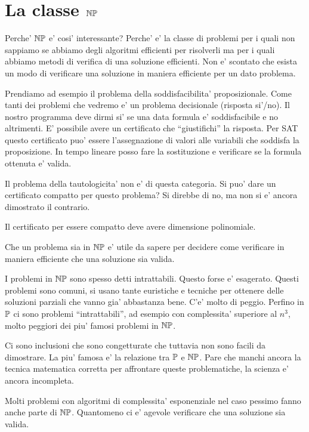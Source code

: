 \section{La classe $\mathbb{NP}$}

Perche' $\mathbb{NP}$ e' cosi' interessante? Perche' e' la classe di problemi per i quali non sappiamo se
abbiamo degli algoritmi efficienti per risolverli ma per i quali abbiamo metodi di verifica di una
soluzione efficienti. Non e' scontato che esista un modo di verificare una soluzione in maniera
efficiente per un dato problema.

Prendiamo ad esempio il problema della soddisfacibilita' proposizionale. Come tanti dei problemi che
vedremo e' un problema decisionale (risposta si'/no). Il nostro programma deve dirmi si' se una data
formula e' soddisfacibile e no altrimenti. E' possibile avere un certificato che ``giustifichi'' la
risposta. Per SAT questo certificato puo' essere l'assegnazione di valori alle variabili che
soddisfa la proposizione. In tempo lineare posso fare la sostituzione e verificare se la formula
ottenuta e' valida.

Il problema della tautologicita' non e' di questa categoria. Si puo' dare un certificato compatto
per questo problema? Si direbbe di no, ma non si e' ancora dimostrato il contrario.

Il certificato per essere compatto deve avere dimensione polinomiale.

Che un problema sia in $\mathbb{NP}$ e' utile da sapere per decidere come verificare in maniera efficiente che
una soluzione sia valida.

I problemi in $\mathbb{NP}$ sono spesso detti intrattabili. Questo forse e' esagerato. Questi problemi
sono comuni, si usano tante euristiche e tecniche per ottenere delle soluzioni parziali che vanno
gia' abbastanza bene. C'e' molto di peggio. Perfino in $\mathbb{P}$ ci sono problemi ``intrattabili'',
ad esempio con complessita' superiore al $n^{3}$, molto peggiori dei piu' famosi problemi in
$\mathbb{NP}$.

Ci sono inclusioni che sono congetturate che tuttavia non sono facili da dimostrare. La piu' famosa
e' la relazione tra $\mathbb{P}$ e $\mathbb{NP}$. Pare che manchi ancora la tecnica matematica corretta
per affrontare queste problematiche, la scienza e' ancora incompleta.

Molti problemi con algoritmi di complessita' esponenziale nel caso pessimo fanno anche parte di
$\mathbb{NP}$. Quantomeno ci e' agevole verificare che una soluzione sia valida.

